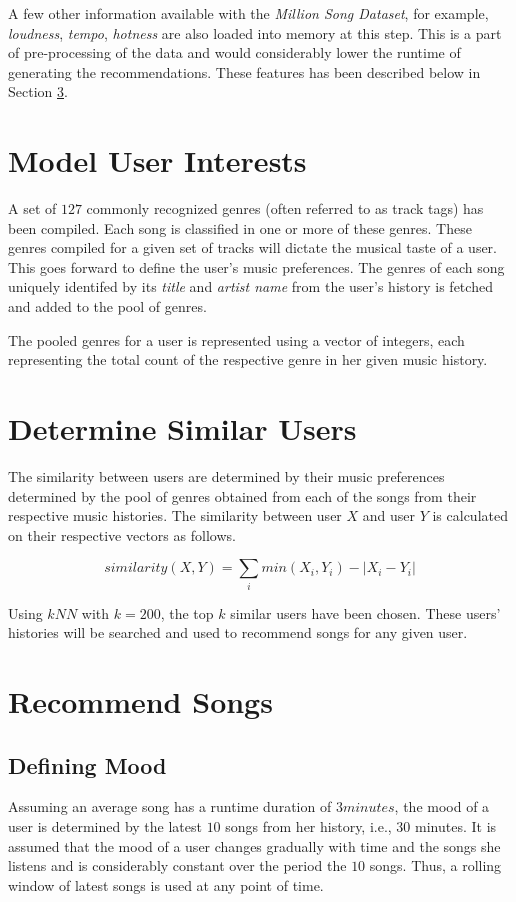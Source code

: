 		A few other information available with the \emph{Million Song Dataset}, for example, \emph{loudness}, \emph{tempo}, \emph{hotness} are also loaded into memory at this step. This is a part of pre-processing of the data and would considerably lower the runtime of generating the recommendations. These features has been described below in Section \ref{sec:recommend}.
	
	\section{Model User Interests}
		A set of \(127\) commonly recognized genres (often referred to as track tags) has been compiled. Each song is classified in one or more of these genres. These genres compiled for a given set of tracks will dictate the musical taste of a user. This goes forward to define the user's music preferences. The genres of each song uniquely identifed by its \emph{title} and \emph{artist name} from the user's history is fetched and added to the pool of genres.
		
		The pooled genres for a user is represented using a vector of integers, each representing the total count of the respective genre in her given music history.
	
	\section{Determine Similar Users}
		The similarity between users are determined by their music preferences determined by the pool of genres obtained from each of the songs from their respective music histories. The similarity between user \(X\) and user \(Y\) is calculated on their respective vectors as follows.
		
		\[ similarity (X, Y) = \sum_{i} min(X_i, Y_i) - |X_i - Y_i| \]
		
		Using \(kNN\) with \(k = 200\), the top \(k\) similar users have been chosen. These users' histories will be searched and used to recommend songs for any given user. 
	
	
	\section{Recommend Songs}
	\label{sec:recommend}
		\subsection{Defining Mood}
			Assuming an average song has a runtime duration of \(3 minutes\), the mood of a user is determined by the latest \(10\) songs from her history, i.e., 30 minutes. It is assumed that the mood of a user changes gradually with time and the songs she listens and is considerably constant over the period the \(10\) songs. Thus, a rolling window of latest songs is used at any point of time.
			
